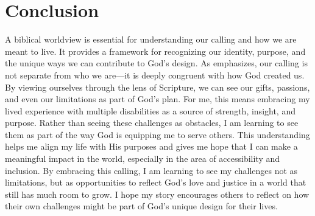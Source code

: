 \documentclass[stu,12pt,floatsintext]{apa7}
\begin{document}
\section{Conclusion}
A biblical worldview is essential for understanding our calling and how we are meant to live. It provides a framework for recognizing our identity, purpose, and the unique ways we can contribute to God's design. As \textcite{Smith2024} emphasizes, our calling is not separate from who we are—it is deeply congruent with how God created us. By viewing ourselves through the lens of Scripture, we can see our gifts, passions, and even our limitations as part of God's plan. For me, this means embracing my lived experience with multiple disabilities as a source of strength, insight, and purpose. Rather than seeing these challenges as obstacles, I am learning to see them as part of the way God is equipping me to serve others. This understanding helps me align my life with His purposes and gives me hope that I can make a meaningful impact in the world, especially in the area of accessibility and inclusion. By embracing this calling, I am learning to see my challenges not as limitations, but as opportunities to reflect God's love and justice in a world that still has much room to grow. I hope my story encourages others to reflect on how their own challenges might be part of God’s unique design for their lives.

\printbibliography
\end{document}
